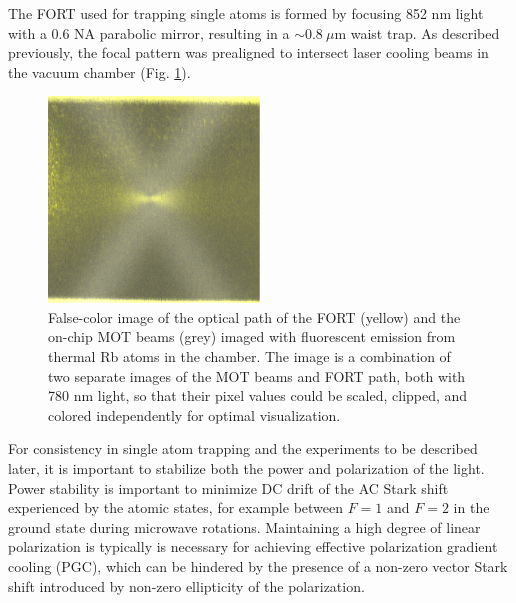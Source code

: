 The FORT used for trapping single atoms is formed by focusing 852 nm light with a 0.6 NA parabolic mirror, resulting in a $\sim0.8~\mu$m waist trap. As described previously, the focal pattern was prealigned to intersect laser cooling beams in the vacuum chamber (Fig. \ref{fig:parabolicfluorescence}).
\begin{figure}[!ht]
    \centering
    \includegraphics[width=0.5\textwidth]{Images/mirror_fluorescence_and_chip_beams_yellow.pdf}
    \caption{False-color image of the optical path of the FORT (yellow) and the on-chip MOT beams (grey) imaged with fluorescent emission from thermal Rb atoms in the chamber. The image is a combination of two separate images of the MOT beams and FORT path, both with 780 nm light, so that their pixel values could be scaled, clipped, and colored independently for optimal visualization.}
    \label{fig:parabolicfluorescence}
\end{figure}
For consistency in single atom trapping and the experiments to be described later, it is important to stabilize both the power and polarization of the light. Power stability is important to minimize DC drift of the AC Stark shift experienced by the atomic states, for example between $F=1$ and $F=2$ in the ground state during microwave rotations. Maintaining a high degree of linear polarization is typically is necessary for achieving effective polarization gradient cooling (PGC), which can be hindered by the presence of a non-zero vector Stark shift introduced by non-zero ellipticity of the polarization\cite{chin2017polarization}.

